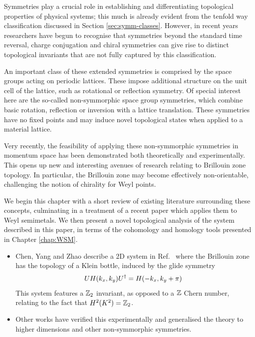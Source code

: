 
Symmetries play a crucial role in establishing and differentiating topological properties of physical systems; this much is already evident from the tenfold way classification discussed in Section \ref{sec:symm-classes}. However, in recent years researchers have begun to recognise that symmetries beyond the standard time reversal, charge conjugation and chiral symmetries can give rise to distinct topological invariants that are not fully captured by this classification.

An important class of these extended symmetries is comprised by the space groups acting on periodic lattices. These impose additional structure on the unit cell of the lattice, such as rotational or reflection symmetry. Of special interest here are the so-called non-symmorphic space group symmetries, which combine basic rotation, reflection or inversion with a lattice translation. These symmetries have no fixed points and may induce novel topological states when applied to a material lattice.

Very recently, the feasibility of applying these non-symmorphic symmetries in momentum space has been demonstrated both theoretically and experimentally. This opens up new and interesting avenues of research relating to Brillouin zone topology. In particular, the Brillouin zone may become effectively non-orientable, challenging the notion of chirality for Weyl points.

We begin this chapter with a short review of existing literature surrounding these concepts, culminating in a treatment of a recent paper which applies them to Weyl semimetals. We then present a novel topological analysis of the system described in this paper, in terms of the cohomology and homology tools presented in Chapter \ref{chap:WSM}.


{\color{blue}
\begin{itemize}
	\item Chen, Yang and Zhao describe a 2D system in Ref.~\cite{CYZ_Klein-gauge} where the Brillouin zone has the topology of a Klein bottle, induced by the glide symmetry
	\begin{equation}\label{eq:2D_glide}
		UH(k_x, k_y)U^\dag = H(-k_x, k_y + \pi)
	\end{equation}
	This system features a $\mathbb{Z}_2$ invariant, as opposed to a $\mathbb{Z}$ Chern number, relating to the fact that $H^2(K^2) = \mathbb{Z}_2$.
	
	\item Other works have verified this experimentally and generalised the theory to higher dimensions and other non-symmorphic symmetries.
\end{itemize}
}

